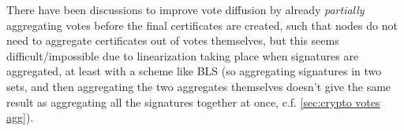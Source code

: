 There have been discussions to improve vote diffusion by already \emph{partially} aggregating votes before the final certificates are created, such that nodes do not need to aggregate certificates out of votes themselves, but this seems difficult/impossible due to linearization taking place when signatures are aggregated, at least with a scheme like BLS (so aggregating signatures in two sets, and then aggregating the two aggregates themselves doesn't give the same result as aggregating all the signatures together at once, c.f. \cref{sec:crypto votes agg}).





